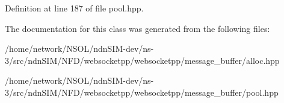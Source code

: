 Definition at line 187 of file pool.\+hpp.



The documentation for this class was generated from the following files\+:\begin{DoxyCompactItemize}
\item 
/home/network/\+N\+S\+O\+L/ndn\+S\+I\+M-\/dev/ns-\/3/src/ndn\+S\+I\+M/\+N\+F\+D/websocketpp/websocketpp/message\+\_\+buffer/alloc.\+hpp\item 
/home/network/\+N\+S\+O\+L/ndn\+S\+I\+M-\/dev/ns-\/3/src/ndn\+S\+I\+M/\+N\+F\+D/websocketpp/websocketpp/message\+\_\+buffer/pool.\+hpp\end{DoxyCompactItemize}
